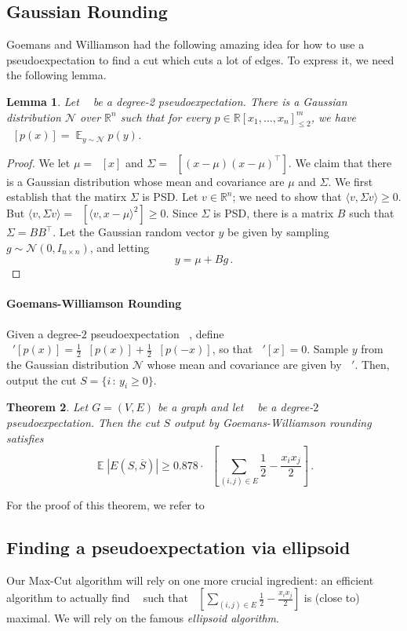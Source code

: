 \documentclass[11pt]{article}
\newtheorem{theorem}{Theorem}
\newtheorem{lemma}[theorem]{Lemma}
\newcommand{\brac}[1]{\left[ #1 \right]}
\newcommand{\iprod}[1]{\langle #1 \rangle}
\newcommand{\R}{\mathbb{R}} %
\newcommand{\cN}{\mathcal{N}}
\DeclareMathOperator{\E}{\mathbb{E}} %
\DeclareMathOperator{\pE}{\widetilde{\mathbb{E}}} %
\begin{document}
\subsection{Gaussian Rounding}
Goemans and Williamson had the following amazing idea for how to use a pseudoexpectation to find a cut which cuts a lot of edges.
To express it, we need the following lemma.
\begin{lemma}
Let $\pE$ be a degree-2 pseudoexpectation.
There is a Gaussian distribution $\cN$ over $\R^n$ such that for every $p \in \R[x_1,\ldots,x_n]_{\leq 2}^m$, we have $\pE[p(x)] = \E_{y \sim \cN} p(y)$.
\end{lemma}
\begin{proof}
We let $\mu = \pE[x]$ and $\Sigma = \pE[(x-\mu)(x-\mu)^\top]$.
We claim that there is a Gaussian distribution whose mean and covariance are $\mu$ and $\Sigma$.
We first establish that the matirx $\Sigma$ is PSD.
Let $v \in \R^n$; we need to show that $\iprod{v,\Sigma v} \geq 0$.
But $\iprod{v,\Sigma v} = \pE[\iprod{v,x-\mu}^2] \geq 0$.
Since $\Sigma$ is PSD, there is a matrix $B$ such that $\Sigma = BB^\top$.
Let the Gaussian random vector $y$ be given by sampling $g \sim \cN(0,I_{n \times n})$, and letting
\[
y = \mu + Bg \, .
\]
\end{proof}

\paragraph{Goemans-Williamson Rounding}
Given a degree-$2$ pseudoexpectation $\pE$, define $\pE'[p(x)] = \tfrac 12 \pE[p(x)] + \tfrac 12 \pE[p(-x)]$, so that $\pE'[x] = 0$. 
Sample $y$ from the Gaussian distribution $\cN$ whose mean and covariance are given by $\pE'$.
Then, output the cut $S = \{ i \, : \, y_i \geq 0\}$.

\begin{theorem}
  \label{thm:GW-rounding}
  Let $G = (V,E)$ be a graph and let $\pE$ be a degree-$2$ pseudoexpectation.
  Then the cut $S$ output by Goemans-Williamson rounding satisfies
  \[
  \E |E(S,\overline{S})| \geq 0.878 \cdot \pE \brac{ \sum_{(i,j) \in E} \frac 12 - \frac{x_i x_j}{2}} \, .
  \]
\end{theorem}

For the proof of this theorem, we refer to \cite{barak-steurer-notes}

\subsection{Finding a pseudoexpectation via ellipsoid}
Our Max-Cut algorithm will rely on one more crucial ingredient: an efficient algorithm to actually find $\pE$ such that $\pE \brac{ \sum_{(i,j) \in E} \frac 12 - \frac{x_i x_j}{2}}$ is (close to) maximal.
We will rely on the famous \emph{ellipsoid algorithm}.
\end{document}

